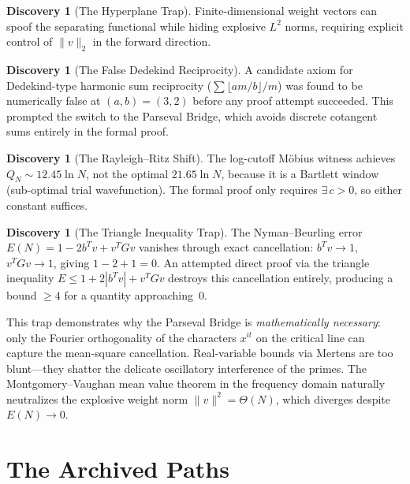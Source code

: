 \documentclass[11pt,a4paper]{article}
\theoremstyle{definition}
\newtheorem{discovery}[definition]{Discovery}
\begin{document}
\begin{discovery}[The Hyperplane Trap]
Finite-dimensional weight vectors can spoof the separating functional
while hiding explosive $L^2$ norms, requiring explicit control of
$\|v\|_2$ in the forward direction.
\end{discovery}

\begin{discovery}[The False Dedekind Reciprocity]
A candidate axiom for Dedekind-type harmonic sum reciprocity
($\sum \lfloor am/b \rfloor / m$) was found to be numerically false
at $(a,b) = (3,2)$ before any proof attempt succeeded. This prompted
the switch to the Parseval Bridge, which avoids discrete cotangent
sums entirely in the formal proof.
\end{discovery}

\begin{discovery}[The Rayleigh--Ritz Shift]
The log-cutoff M\"obius witness achieves $Q_N \sim 12.45 \ln N$, not
the optimal $21.65 \ln N$, because it is a Bartlett window (sub-optimal
trial wavefunction). The formal proof only requires $\exists\,c > 0$,
so either constant suffices.
\end{discovery}

\begin{discovery}[The Triangle Inequality Trap]
\label{disc:triangle}
The Nyman--Beurling error $E(N) = 1 - 2b^Tv + v^TGv$ vanishes through
exact cancellation: $b^Tv \to 1$, $v^TGv \to 1$, giving $1-2+1=0$.
An attempted direct proof via the triangle inequality
$E \le 1 + 2|b^Tv| + v^TGv$ destroys this cancellation entirely,
producing a bound $\ge 4$ for a quantity approaching~$0$.

This trap demonstrates why the Parseval Bridge is
\emph{mathematically necessary}: only the Fourier orthogonality
of the characters $x^{it}$ on the critical line can capture the
mean-square cancellation. Real-variable bounds via Mertens are
too blunt---they shatter the delicate oscillatory interference of
the primes. The Montgomery--Vaughan mean value theorem in the
frequency domain naturally neutralizes the explosive weight norm
$\|v\|^2 = \Theta(N)$, which diverges despite $E(N) \to 0$.
\end{discovery}

\section{The Archived Paths}
\end{document}
